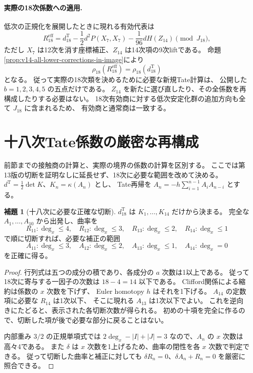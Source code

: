 \documentclass[a4paper,11pt]{ltjsarticle}
\theoremstyle{definition}
\newtheorem{lemma}[theorem]{補題}
\begin{document}
\paragraph{実際の18次係数への適用.}
低次の正規化を展開したときに現れる有効代表は
\[
 R_{18}^{\mathrm{eff}}
 =d_{18}^{\mathrm T}
  -\frac12d^2P(X_7,X_7)-\frac1{96}dH(Z_{14})
 \pmod{J_{18}},
\]
ただし $X_7$ は12次を消す座標補正、$Z_{14}$ は14次項の9次liftである。
命題\ref{prop:v14-all-lower-corrections-in-image}により
\[
 \rho_{18}(R_{18}^{\mathrm{eff}})=\rho_{18}(d_{18}^{\mathrm T})
\]
となる。
従って実際の18次類を決めるために必要な新規Tate計算は、
公開した $b=1,2,3,4,5$ の五点だけである。
$Z_{14}$ を新たに選び直したり、その全係数を再構成したりする必要はない。
18次有効商に対する低次安定化群の追加方向も全て $J_{18}$ に含まれるため、
有効商と通常商は一致する。



\section{十八次Tate係数の厳密な再構成}
\label{sec:v14-tate-eighteenth}

前節までの接触商の計算と、実際の境界の係数の計算を区別する。
ここでは第13版の切断を証明なしに延長せず、18次に必要な範囲を改めて決める。
$d^{\mathrm T}=\tfrac12\det K$、$K_n=\kappa(A_n)$ とし、
Tate再帰を $A_n=-h\sum_{i=1}^{n-1}A_iA_{n-i}$ とする。

\begin{lemma}[十八次に必要な正確な切断]
\label{lem:v14-exact-fourteenth-truncation}
$d^{\mathrm T}_{18}$ は $K_1,\ldots,K_{14}$ だけから決まる。
完全な $A_1,\ldots,A_{10}$ から出発し、曲率を
\[
 R_{11}:\deg_x\le4,\quad
 R_{12}:\deg_x\le3,\quad
 R_{13}:\deg_x\le2,\quad
 R_{14}:\deg_x\le1
\]
で順に切断すれば、必要な補正の範囲
\[
 A_{11}:\deg_x\le3,\quad
 A_{12}:\deg_x\le2,\quad
 A_{13}:\deg_x\le1,\quad
 A_{14}:\deg_x=0
\]
を正確に得る。
\end{lemma}

\begin{proof}
行列式は五つの成分の積であり、各成分の $a$ 次数は1以上である。
従って18次に寄与する一因子の次数は $18-4=14$ 以下である。
Clifford関係による縮約は係数の $x$ 次数を下げず、
Euler homotopy $h$ はそれを1下げる。
$A_{14}$ の定数項に必要な $R_{14}$ は1次以下、
そこに現れる $A_{13}$ は1次以下でよい。
これを逆向きにたどると、表示された各切断次数が得られる。
初めの十項を完全に作るので、切断した項が後で必要な部分に戻ることはない。

内部重み $3/2$ の正規単項式では
$2\deg_x-|I|+|J|=3$ なので、$A_n$ の $x$ 次数は高々4である。
また $\delta$ は $x$ 次数を1上げるため、曲率の閉性を各 $x$ 次数で判定できる。
従って切断した曲率と補正に対しても
$\delta R_n=0$、$\delta A_n+R_n=0$ を厳密に照合できる。
\end{proof}
\end{document}
